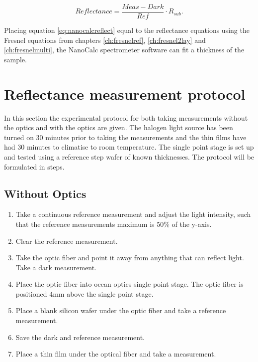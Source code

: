 \documentclass[MasterThesisMain.tex]{subfiles}
\begin{document}
\begin{equation}\label{eq:nanocalcreflect}
Reflectance = \frac{Meas-Dark}{Ref} \cdot R_{sub}.
\end{equation}

Placing equation \ref{eq:nanocalcreflect} equal to the reflectance equations using the Fresnel equations from chapters  \ref{ch:fresnelref}, \ref{ch:fresnel2lay} and \ref{ch:fresnelmulti}, the NanoCalc spectrometer software can fit a thickness of the sample.


\section{Reflectance measurement protocol}
In this section the experimental protocol for both taking measurements without the optics and with the optics are given. The halogen light source has been turned on 30 minutes prior to taking the measurements and the thin films have had 30 minutes to climatise to room temperature. The single point stage is set up and tested using a reference step wafer of known thicknesses. The protocol will be formulated in steps.

\subsection{Without Optics}
\begin{enumerate}
\item Take a continuous reference measurement and adjust the light intensity, such that the reference measurements maximum is $50\%$ of the y-axis.
\item Clear the reference measurement.
\item Take the optic fiber and point it away from anything that can reflect light. Take a dark measurement.
\item Place the optic fiber into ocean optics single point stage. The optic fiber is positioned $4$mm above the single point stage.
\item Place a blank silicon wafer under the optic fiber and take a reference measurement.
\item Save the dark and reference measurement.
\item Place a thin film under the optical fiber and take a measurement.  
\end{enumerate}
\end{document}
